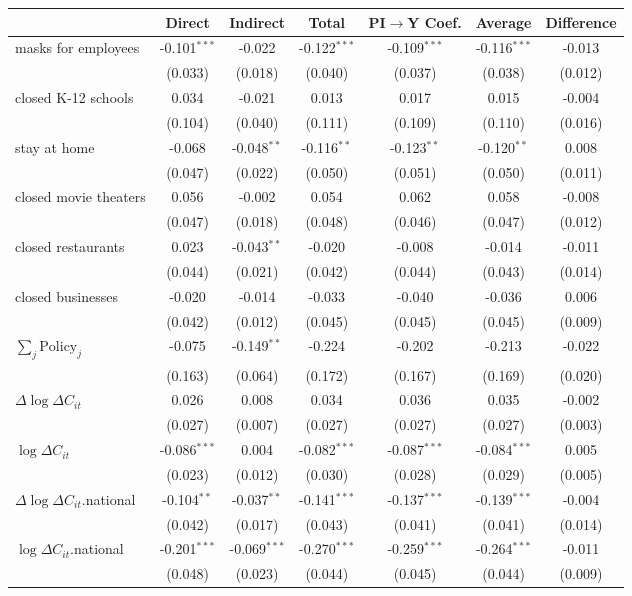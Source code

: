 
\begin{tabular}{lccccc|>{}c}
\toprule
  & Direct & Indirect & Total & PI$\to$Y Coef. & Average & Difference\\
\midrule
masks for employees & -0.101$^{***}$ & -0.022 & -0.122$^{***}$ & -0.109$^{***}$ & -0.116$^{***}$ & -0.013\\
 & (0.033) & (0.018) & (0.040) & (0.037) & (0.038) & (0.012)\\
closed K-12 schools & 0.034 & -0.021 & 0.013 & 0.017 & 0.015 & -0.004\\
 & (0.104) & (0.040) & (0.111) & (0.109) & (0.110) & (0.016)\\
stay at home & -0.068 & -0.048$^{**}$ & -0.116$^{**}$ & -0.123$^{**}$ & -0.120$^{**}$ & 0.008\\
 & (0.047) & (0.022) & (0.050) & (0.051) & (0.050) & (0.011)\\
closed movie theaters & 0.056 & -0.002 & 0.054 & 0.062 & 0.058 & -0.008\\
 & (0.047) & (0.018) & (0.048) & (0.046) & (0.047) & (0.012)\\
closed restaurants & 0.023 & -0.043$^{**}$ & -0.020 & -0.008 & -0.014 & -0.011\\
 & (0.044) & (0.021) & (0.042) & (0.044) & (0.043) & (0.014)\\
closed businesses & -0.020 & -0.014 & -0.033 & -0.040 & -0.036 & 0.006\\
 & (0.042) & (0.012) & (0.045) & (0.045) & (0.045) & (0.009)\\
$\sum_j \mathrm{Policy}_j$ & -0.075 & -0.149$^{**}$ & -0.224 & -0.202 & -0.213 & -0.022\\
 & (0.163) & (0.064) & (0.172) & (0.167) & (0.169) & (0.020)\\
$\Delta \log \Delta C_{it}$ & 0.026 & 0.008 & 0.034 & 0.036 & 0.035 & -0.002\\
 & (0.027) & (0.007) & (0.027) & (0.027) & (0.027) & (0.003)\\
$\log \Delta C_{it}$ & -0.086$^{***}$ & 0.004 & -0.082$^{***}$ & -0.087$^{***}$ & -0.084$^{***}$ & 0.005\\
 & (0.023) & (0.012) & (0.030) & (0.028) & (0.029) & (0.005)\\
$\Delta \log \Delta C_{it}$.national & -0.104$^{**}$ & -0.037$^{**}$ & -0.141$^{***}$ & -0.137$^{***}$ & -0.139$^{***}$ & -0.004\\
 & (0.042) & (0.017) & (0.043) & (0.041) & (0.041) & (0.014)\\
$\log \Delta C_{it}$.national & -0.201$^{***}$ & -0.069$^{***}$ & -0.270$^{***}$ & -0.259$^{***}$ & -0.264$^{***}$ & -0.011\\
 & (0.048) & (0.023) & (0.044) & (0.045) & (0.044) & (0.009)\\
\bottomrule
\end{tabular}